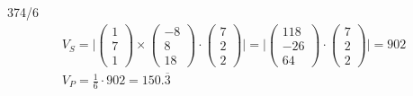\begin{exercise}{374/6}
\begin{gather*}
    V_S = \Biggl|\begin{pmatrix}1 \\ 7 \\ 1\end{pmatrix} \times \begin{pmatrix}-8 \\ 8 \\ 18\end{pmatrix} \cdot \begin{pmatrix}7 \\ 2 \\ 2\end{pmatrix}\Biggr| = \Biggl|\begin{pmatrix}118 \\ -26 \\ 64\end{pmatrix} \cdot \begin{pmatrix}7 \\ 2 \\ 2\end{pmatrix}\Biggr| = 902 \\
    V_P = \frac{1}{6} \cdot 902 = 150.\overline{3}
  \end{gather*}
\end{exercise}
